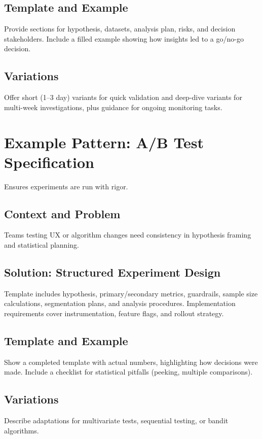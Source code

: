 \subsection{Template and Example}
Provide sections for hypothesis, datasets, analysis plan, risks, and decision stakeholders. Include a filled example showing how insights led to a go/no-go decision.

\subsection{Variations}
Offer short (1--3 day) variants for quick validation and deep-dive variants for multi-week investigations, plus guidance for ongoing monitoring tasks.

\section{Example Pattern: A/B Test Specification}
\label{sec:example-ab-test}

Ensures experiments are run with rigor.

\subsection{Context and Problem}
Teams testing UX or algorithm changes need consistency in hypothesis framing and statistical planning.

\subsection{Solution: Structured Experiment Design}
Template includes hypothesis, primary/secondary metrics, guardrails, sample size calculations, segmentation plans, and analysis procedures. Implementation requirements cover instrumentation, feature flags, and rollout strategy.

\subsection{Template and Example}
Show a completed template with actual numbers, highlighting how decisions were made. Include a checklist for statistical pitfalls (peeking, multiple comparisons).

\subsection{Variations}
Describe adaptations for multivariate tests, sequential testing, or bandit algorithms.

